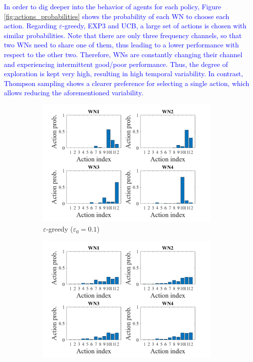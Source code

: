 \documentclass[preprint,12pt]{elsarticle}
\begin{document}
	\textcolor{blue}{In order to dig deeper into the behavior of agents for each policy, Figure \ref{fig:actions_probabilities} shows the probability of each WN to choose each action. Regarding $\varepsilon$-greedy, EXP3 and UCB, a large set of actions is chosen with similar probabilities. Note that there are only three frequency channels, so that two WNs need to share one of them, thus leading to a lower performance with respect to the other two. Therefore, WNs are constantly changing their channel and experiencing intermittent good/poor performance. Thus, the degree of exploration is kept very high, resulting in high temporal variability. In contrast, Thompson sampling shows a clearer preference for selecting a single action, which allows reducing the aforementioned variability.}
	
	\begin{figure}[t!]
		\centering
		\begin{subfigure}[b]{0.43\textwidth}
			\includegraphics[width=\textwidth]{images/actions_probability_EG}
			\caption{$\varepsilon$-greedy ($\varepsilon_0  = 0.1$)}
			\label{fig:actions_probability_EG}
		\end{subfigure}
		\begin{subfigure}[b]{0.43\textwidth}
			\includegraphics[width=\textwidth]{images/actions_probability_EXP3}

\end{subfigure}
\end{figure}
\end{document}
